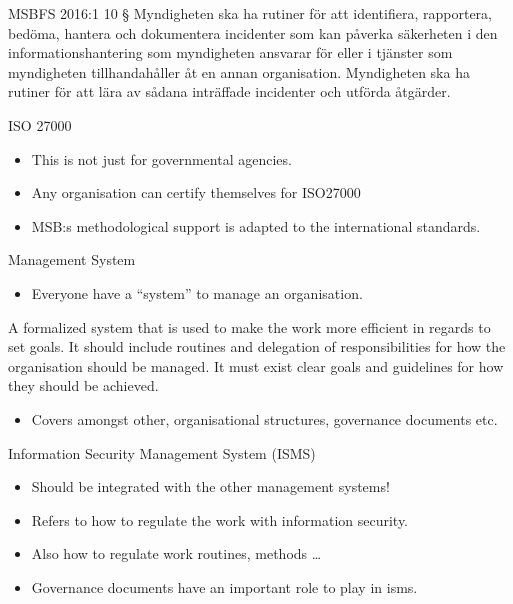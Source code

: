 \documentclass{beamer}
\begin{document}
\begin{frame}{MSBFS 2016:1}
  10 § Myndigheten ska ha rutiner för att identifiera, rapportera, bedöma,
  hantera och dokumentera incidenter som kan påverka säkerheten i den
  informationshantering som myndigheten ansvarar för eller i tjänster som
  myndigheten tillhandahåller åt en annan organisation. Myndigheten ska ha
  rutiner för att lära av sådana inträffade incidenter och utförda åtgärder. 
\end{frame}

\begin{frame}{ISO 27000}
  \begin{itemize}
    \item This is not just for governmental agencies.

    \item Any organisation can certify themselves for ISO27000

    \item MSB:s methodological support is adapted to the international
      standards.

  \end{itemize}
\end{frame}

\begin{frame}{Management System}
  \begin{itemize}
    \item Everyone have a \enquote{system} to manage an organisation.
  \end{itemize}
      A formalized system that is used to make the work more efficient in
      regards to set goals. It should include routines and delegation of
      responsibilities for how the organisation should be managed. It must exist
      clear goals and guidelines for how they should be achieved.
  \begin{itemize}
    \item Covers amongst other, organisational structures, governance documents
      etc.
  \end{itemize}
\end{frame}

\begin{frame}{Information Security Management System (ISMS)}
  \begin{itemize}
    \item Should be integrated with the other management systems!
    \item Refers to how to regulate the work with information security.
    \item Also how to regulate work routines, methods \dots
    \item Governance documents have an important role to play in \ac{isms}\@.
  \end{itemize}
\end{frame}
\end{document}
